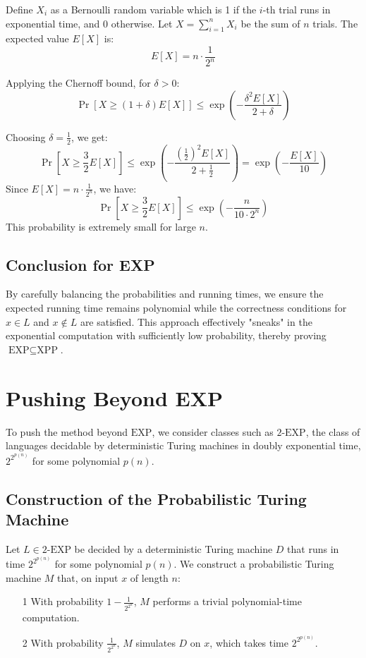 \documentclass{article}
\begin{document}
Define \(X_i\) as a Bernoulli random variable which is 1 if the \(i\)-th trial runs in exponential time, and 0 otherwise. Let \(X = \sum_{i=1}^n X_i\) be the sum of \(n\) trials. The expected value \(E[X]\) is:
\[
E[X] = n \cdot \frac{1}{2^n}
\]

Applying the Chernoff bound, for \(\delta > 0\):
\[
\Pr[X \geq (1+\delta)E[X]] \leq \exp\left(-\frac{\delta^2 E[X]}{2 + \delta}\right)
\]

Choosing \(\delta = \frac{1}{2}\), we get:
\[
\Pr\left[X \geq \frac{3}{2}E[X]\right] \leq \exp\left(-\frac{\left(\frac{1}{2}\right)^2 E[X]}{2 + \frac{1}{2}}\right) = \exp\left(-\frac{E[X]}{10}\right)
\]
Since \(E[X] = n \cdot \frac{1}{2^n}\), we have:
\[
\Pr\left[X \geq \frac{3}{2}E[X]\right] \leq \exp\left(-\frac{n}{10 \cdot 2^n}\right)
\]
This probability is extremely small for large \(n\).


\subsection*{Conclusion for EXP}

By carefully balancing the probabilities and running times, we ensure the expected running time remains polynomial while the correctness conditions for \(x \in L\) and \(x \not\in L\) are satisfied. This approach effectively "sneaks" in the exponential computation with sufficiently low probability, thereby proving \(\text{EXP} \subseteq \text{XPP}\).


\section*{Pushing Beyond EXP}

To push the method beyond \(\text{EXP}\), we consider classes such as \(\text{2-EXP}\), the class of languages decidable by deterministic Turing machines in doubly exponential time, \(2^{2^{p(n)}}\) for some polynomial \(p(n)\).

\subsection*{Construction of the Probabilistic Turing Machine}

Let \(L \in \text{2-EXP}\) be decided by a deterministic Turing machine \(D\) that runs in time \(2^{2^{p(n)}}\) for some polynomial \(p(n)\). We construct a probabilistic Turing machine \(M\) that, on input \(x\) of length \(n\):
\begin{itemize}
    \item[1] With probability \(1 - \frac{1}{2^{2^n}}\), \(M\) performs a trivial polynomial-time computation.
    \item[2] With probability \(\frac{1}{2^{2^n}}\), \(M\) simulates \(D\) on \(x\), which takes time \(2^{2^{p(n)}}\).
\end{itemize}
\end{document}
